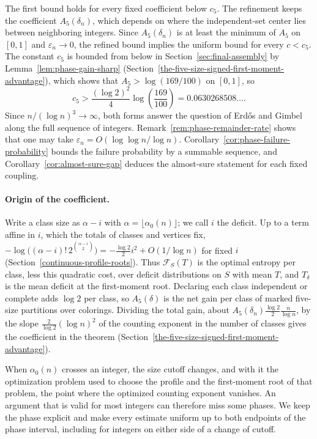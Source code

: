 \documentclass[a4paper,10pt,reqno]{amsart}
\numberwithin{equation}{section}
\theoremstyle{plain}
\theoremstyle{remark}
\begin{document}
The first bound holds for every fixed coefficient below \(c_5\). The
refinement keeps the coefficient \(A_5(\delta_n)\), which depends on where
the independent-set center lies between neighboring integers. Since
\(A_5(\delta_n)\) is at least the minimum of \(A_5\) on \([0,1]\) and
\(\varepsilon_n\to0\), the refined bound implies the uniform bound for every
\(c<c_5\). The constant \(c_5\) is bounded from below in
Section~\ref{sec:final-assembly} by Lemma~\ref{lem:phase-gain-sharp}
(Section~\ref{the-five-size-signed-first-moment-advantage}), which shows that
\(A_5>\log(169/100)\) on \([0,1]\), so
\[
  c_5>\frac{(\log 2)^2}{4}\log\!\left(\frac{169}{100}\right)
  =0.0630268508\ldots.
\]
Since \(n/(\log n)^3\to\infty\), both forms answer the question of
Erd\H{o}s and Gimbel along the full sequence of integers.
Remark~\ref{rem:phase-remainder-rate} shows that one may take
\(\varepsilon_n=O(\log\log n/\log n)\).
Corollary~\ref{cor:phase-failure-probability} bounds the failure probability
by a summable sequence, and Corollary~\ref{cor:almost-sure-gap} deduces the
almost-sure statement for each fixed coupling.

\paragraph{Origin of the coefficient.}
Write a class size as $\alpha-i$ with $\alpha=\lfloor\alpha_0(n)\rfloor$; we
call $i$ the deficit. Up to a term affine in $i$, which the totals of classes
and vertices fix,
$-\log\bigl((\alpha-i)!\,2^{\binom{\alpha-i}2}\bigr)
=-\frac{\log 2}2i^2+O(1/\log n)$
for fixed $i$ (Section~\ref{continuous-profile-roots}). Thus
$\mathcal F_S(T)$ is the optimal entropy per class, less this quadratic cost,
over deficit distributions on $S$ with mean $T$, and $T_\delta$ is the mean
deficit at the first-moment root. Declaring each class independent or
complete adds $\log 2$ per class, so $A_5(\delta)$ is the net gain per class
of marked five-size partitions over colorings. Dividing the total gain, about
$A_5(\delta_n)\frac{\log 2}2\frac n{\log n}$, by the slope
$\frac2{\log 2}(\log n)^2$ of the counting exponent in the number of classes
gives the coefficient in the theorem
(Section~\ref{the-five-size-signed-first-moment-advantage}).

When
$\alpha_0(n)$ crosses an integer, the size cutoff changes, and with it the
optimization problem used to choose the profile and the first-moment root
of that problem, the point where the optimized counting exponent vanishes.
An argument that is valid for most integers can therefore miss some phases.
We keep the phase explicit and make every estimate uniform up to both
endpoints of the phase interval, including for integers on either side of
a change of cutoff.
\end{document}
